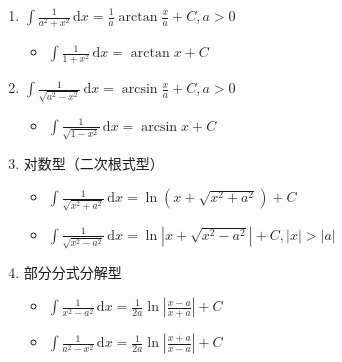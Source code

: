 \documentclass[a4paper,12pt]{article}
\begin{document}
\begin{enumerate}
\begin{itemize}
            \item $\int \sec x \tan x\,\mathrm{d}x = \sec x + C$
            \item $\int \csc x \cot x\,\mathrm{d}x = -\csc x + C$
        \end{itemize}
        \item $\int \displaystyle\frac{1}{a^2 + x^2}\,\mathrm{d}x = \displaystyle\frac{1}{a}\arctan \displaystyle\frac{x}{a} + C, a > 0$
        \begin{itemize}
            \item $\int \displaystyle\frac{1}{1 + x^2}\,\mathrm{d}x = \arctan x + C$
        \end{itemize}
        \item $\int \displaystyle\frac{1}{\sqrt {a^2 - x^2}}\,\mathrm{d}x = \arcsin \displaystyle\frac{x}{a} + C, a > 0$
        \begin{itemize}
            \item $\int \displaystyle\frac{1}{\sqrt {1 - x^2}}\,\mathrm{d}x = \arcsin x + C$
        \end{itemize}
        \item 对数型（二次根式型）
        \begin{itemize}
            \item $\int \displaystyle\frac{1}{\sqrt {x^2 + a^2}}\,\mathrm{d}x = \ln (x + \sqrt {x^2 + a^2}) + C$
            \item $\int \displaystyle\frac{1}{\sqrt {x^2 - a^2}}\,\mathrm{d}x = \ln |x + \sqrt {x^2 - a^2}| + C, |x| > |a|$
        \end{itemize}
        \item 部分分式分解型
        \begin{itemize}
            \item $\int \displaystyle\frac{1}{x^2 - a^2}\,\mathrm{d}x = \displaystyle\frac{1}{2a}\ln \left|\displaystyle\frac{x-a}{x+a}\right| + C$
            \item $\int \displaystyle\frac{1}{a^2 - x^2}\,\mathrm{d}x = \displaystyle\frac{1}{2a}\ln \left|\displaystyle\frac{x+a}{x-a}\right| + C$

\end{itemize}
\end{enumerate}
\end{document}
